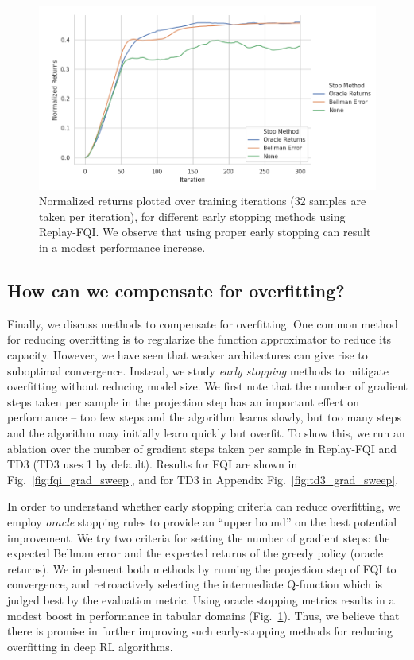 \begin{figure}[ttt!]
\begin{minipage}[t]{0.32\linewidth}
\includegraphics[trim={0 0 4.4cm 0},clip,width=0.95\columnwidth]{chapters/diagnosing_q/images/validation_stop}
\caption{\label{fig:validation_stop}Normalized returns plotted over training iterations (32 samples are taken per iteration), for different early stopping methods using Replay-FQI. We observe that using proper early stopping can result in a modest performance increase.}
\end{minipage}
\end{figure}

\subsection{How can we compensate for overfitting?}

Finally, we discuss methods to compensate for overfitting. One common method for reducing overfitting is to regularize the function approximator to reduce its capacity. However, we have seen that weaker architectures can give rise to suboptimal convergence. Instead, we study \textit{early stopping} methods to mitigate overfitting without reducing model size.
We first note that the number of gradient steps taken per sample in the projection step has an important effect on performance -- too few steps and the algorithm learns slowly, but too many steps and the algorithm may initially learn quickly but overfit. To show this, we run an ablation over the number of gradient steps taken per sample in Replay-FQI and TD3 (TD3 uses 1 by default). Results for FQI are shown in Fig.~\ref{fig:fqi_grad_sweep}, and for TD3 in Appendix Fig.~\ref{fig:td3_grad_sweep}.

In order to understand whether early stopping criteria can reduce overfitting, we employ \emph{oracle} stopping rules to provide an ``upper bound'' on the best potential improvement. We try two criteria for setting the number of gradient steps: the expected Bellman error and the expected returns of the greedy policy (oracle returns). We implement both methods by running the projection step of FQI to convergence, and retroactively selecting the intermediate Q-function which is judged best by the evaluation metric. Using oracle stopping metrics results in a modest boost in performance in tabular domains (Fig.~\ref{fig:validation_stop}). Thus, we believe that there is promise in further improving such early-stopping methods for reducing overfitting in deep RL algorithms.


